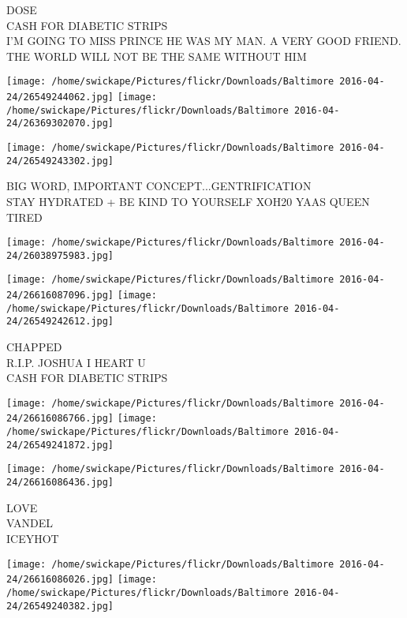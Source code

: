 \documentclass[10pt,letterpaper]{article}
\begin{document}
DOSE\\
CASH FOR DIABETIC STRIPS\\
I'M GOING TO MISS PRINCE HE WAS MY MAN.  A VERY GOOD FRIEND.  THE WORLD WILL NOT BE THE SAME WITHOUT HIM\\
\pagebreak

\texttt{[image: /home/swickape/Pictures/flickr/Downloads/Baltimore 2016-04-24/26549244062.jpg]}
\texttt{[image: /home/swickape/Pictures/flickr/Downloads/Baltimore 2016-04-24/26369302070.jpg]}

\vspace{0.25in}
\texttt{[image: /home/swickape/Pictures/flickr/Downloads/Baltimore 2016-04-24/26549243302.jpg]}

BIG WORD, IMPORTANT CONCEPT...GENTRIFICATION\\
STAY HYDRATED + BE KIND TO YOURSELF XOH20 YAAS QUEEN\\
TIRED\\
\pagebreak

\texttt{[image: /home/swickape/Pictures/flickr/Downloads/Baltimore 2016-04-24/26038975983.jpg]}

\vspace{0.25in}
\texttt{[image: /home/swickape/Pictures/flickr/Downloads/Baltimore 2016-04-24/26616087096.jpg]}
\texttt{[image: /home/swickape/Pictures/flickr/Downloads/Baltimore 2016-04-24/26549242612.jpg]}

CHAPPED\\
R.I.P. JOSHUA I HEART U\\
CASH FOR DIABETIC STRIPS\\
\pagebreak

\texttt{[image: /home/swickape/Pictures/flickr/Downloads/Baltimore 2016-04-24/26616086766.jpg]}
\texttt{[image: /home/swickape/Pictures/flickr/Downloads/Baltimore 2016-04-24/26549241872.jpg]}

\vspace{0.25in}
\texttt{[image: /home/swickape/Pictures/flickr/Downloads/Baltimore 2016-04-24/26616086436.jpg]}

LOVE\\
VANDEL\\
ICEYHOT\\
\pagebreak

\texttt{[image: /home/swickape/Pictures/flickr/Downloads/Baltimore 2016-04-24/26616086026.jpg]}
\texttt{[image: /home/swickape/Pictures/flickr/Downloads/Baltimore 2016-04-24/26549240382.jpg]}
\end{document}
